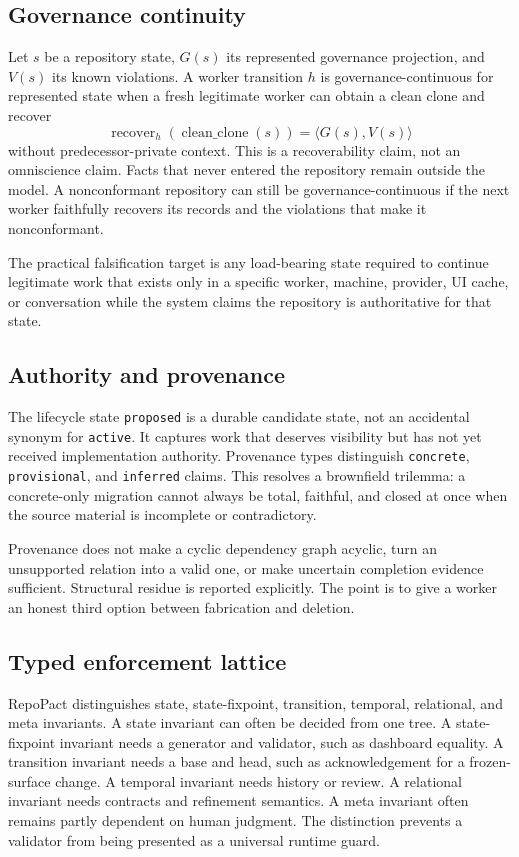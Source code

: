 \documentclass[11pt]{article}
\begin{document}
\subsection{Governance continuity}

Let $s$ be a repository state, $G(s)$ its represented governance projection, and
$V(s)$ its known violations. A worker transition $h$ is governance-continuous for
represented state when a fresh legitimate worker can obtain a clean clone and recover
\[
  \operatorname{recover}_h(\operatorname{clean\_clone}(s)) = \langle G(s), V(s)\rangle
\]
without predecessor-private context. This is a recoverability claim, not an omniscience
claim. Facts that never entered the repository remain outside the model. A nonconformant
repository can still be governance-continuous if the next worker faithfully recovers its
records and the violations that make it nonconformant.

The practical falsification target is any load-bearing state required to continue
legitimate work that exists only in a specific worker, machine, provider, UI cache, or
conversation while the system claims the repository is authoritative for that state.

\subsection{Authority and provenance}

The lifecycle state \texttt{proposed} is a durable candidate state, not an accidental
synonym for \texttt{active}. It captures work that deserves visibility but has not yet
received implementation authority. Provenance types distinguish \texttt{concrete},
\texttt{provisional}, and \texttt{inferred} claims. This resolves a brownfield
trilemma: a concrete-only migration cannot always be total, faithful, and closed at once
when the source material is incomplete or contradictory.

Provenance does not make a cyclic dependency graph acyclic, turn an unsupported relation
into a valid one, or make uncertain completion evidence sufficient. Structural residue is
reported explicitly. The point is to give a worker an honest third option between
fabrication and deletion.

\subsection{Typed enforcement lattice}

RepoPact distinguishes state, state-fixpoint, transition, temporal, relational, and meta
invariants. A state invariant can often be decided from one tree. A state-fixpoint
invariant needs a generator and validator, such as dashboard equality. A transition
invariant needs a base and head, such as acknowledgement for a frozen-surface change. A
temporal invariant needs history or review. A relational invariant needs contracts and
refinement semantics. A meta invariant often remains partly dependent on human judgment.
The distinction prevents a validator from being presented as a universal runtime guard.
\end{document}
